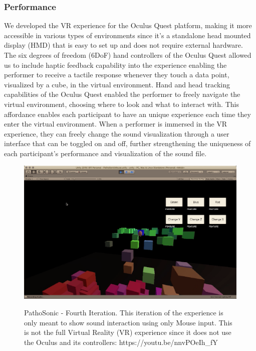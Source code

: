 \documentclass{nime-alternate}
\begin{document}
\subsubsection{Performance}

We developed the VR experience for the Oculus Quest platform, making it more accessible in various types of environments since it’s a standalone head mounted display (HMD) that is easy to set up and does not require external hardware. The six degrees of freedom (6DoF) hand controllers of the Oculus Quest allowed us to include haptic feedback capability into the experience enabling the performer to receive a  tactile response whenever they touch a data point, visualized by a cube, in the virtual environment. Hand and head tracking capabilities of the Oculus Quest enabled the performer to freely navigate the virtual environment, choosing where to look and what to interact with. This affordance enables each participant to have an unique experience each time they enter the virtual environment. When a performer is immersed in the VR experience, they can freely change the sound visualization through a user interface that can be toggled on and off, further strengthening the uniqueness of each participant's performance and visualization of the sound file. 


\begin{figure}[htbp]
       \centering
              \includegraphics[width=1\textwidth]{screen-rec.png}
       \label{PathoSonic - Fourth Iteration. This iteration of the experience is only meant to show sound interaction using only Mouse input. This is not the full Virtual Reality (VR) experience since it does not use the Oculus and its controllers: https://youtu.be/nnvPOeIh_fY}
       \caption{PathoSonic - Fourth Iteration. This iteration of the experience is only meant to show sound interaction using only Mouse input. This is not the full Virtual Reality (VR) experience since it does not use the Oculus and its controllers: https://youtu.be/nnvPOeIh\_fY}
\end{figure}
\end{document}
